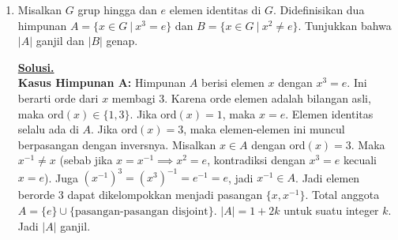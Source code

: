 \documentclass[12pt,twoside]{article}
\newenvironment{solution}
{
	\par\noindent\textbf{\underline{Solusi.}}\\
}
{
	\par
}
\begin{document}
\begin{enumerate}
\begin{solution}
          Determinan matriks blok diagonal adalah hasil kali determinan blok diagonalnya:
          $$ \det \begin{pmatrix} D & 0 \\ 0 & E \end{pmatrix} = \det(D) \det(E). $$
          Karena $D$ dan $E$ diagonal, $\det(D) = d_1 d_2 \dots d_n$ dan $\det(E) = e_1 e_2 \dots e_n$.
          Jadi: $(-1)^n \det(M) = (\prod d_i)(\prod e_i)$.
          $$ \det(M) = (-1)^n \prod_{i=1}^n d_i \prod_{j=1}^n e_j. $$
          Perhatikan eksponen $(-1)^{mn}$ pada soal. Karena $m=n$, maka $mn = n^2$.
          Untuk bilangan bulat $n$, paritas $n^2$ sama dengan paritas $n$ (jika $n$ genap, $n^2$ genap; jika $n$ ganjil, $n^2$ ganjil).
          Sehingga $(-1)^n = (-1)^{n^2} = (-1)^{mn}$.
          Terbukti $\det(M) = (-1)^{mn} d_1 \dots d_m e_1 \dots e_n$.
        \end{solution}

  \item Misalkan $G$ grup hingga dan $e$ elemen identitas di $G$. Didefinisikan dua himpunan $A=\{x\in G~|~x^3=e\}$ dan $B=\{x\in G~|~x^2\neq e\}$. Tunjukkan bahwa $|A|$ ganjil dan $|B|$ genap.
        \begin{solution}
          \textbf{Kasus Himpunan A:}
          Himpunan $A$ berisi elemen $x$ dengan $x^3=e$. Ini berarti orde dari $x$ membagi 3.
          Karena orde elemen adalah bilangan asli, maka ord$(x) \in \{1, 3\}$.
          Jika ord$(x)=1$, maka $x=e$. Elemen identitas selalu ada di $A$.
          Jika ord$(x)=3$, maka elemen-elemen ini muncul berpasangan dengan inversnya.
          Misalkan $x \in A$ dengan ord$(x)=3$. Maka $x^{-1} \neq x$ (sebab jika $x=x^{-1} \implies x^2=e$, kontradiksi dengan $x^3=e$ kecuali $x=e$).
          Juga $(x^{-1})^3 = (x^3)^{-1} = e^{-1} = e$, jadi $x^{-1} \in A$.
          Jadi elemen berorde 3 dapat dikelompokkan menjadi pasangan $\{x, x^{-1}\}$.
          Total anggota $A = \{e\} \cup \{ \text{pasangan-pasangan disjoint} \}$.
          $|A| = 1 + 2k$ untuk suatu integer $k$. Jadi $|A|$ ganjil.


\end{solution}
\end{enumerate}
\end{document}
